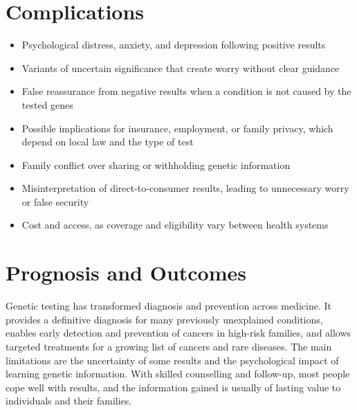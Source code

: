 \section*{Complications}
\begin{itemize}
    \item Psychological distress, anxiety, and depression following positive results
    \item Variants of uncertain significance that create worry without clear guidance
    \item False reassurance from negative results when a condition is not caused by the tested genes
    \item Possible implications for insurance, employment, or family privacy, which depend on local law and the type of test
    \item Family conflict over sharing or withholding genetic information
    \item Misinterpretation of direct-to-consumer results, leading to unnecessary worry or false security
    \item Cost and access, as coverage and eligibility vary between health systems
\end{itemize}

\section*{Prognosis and Outcomes}
Genetic testing has transformed diagnosis and prevention across medicine. It provides a definitive diagnosis for many previously unexplained conditions, enables early detection and prevention of cancers in high-risk families, and allows targeted treatments for a growing list of cancers and rare diseases. The main limitations are the uncertainty of some results and the psychological impact of learning genetic information. With skilled counselling and follow-up, most people cope well with results, and the information gained is usually of lasting value to individuals and their families.

